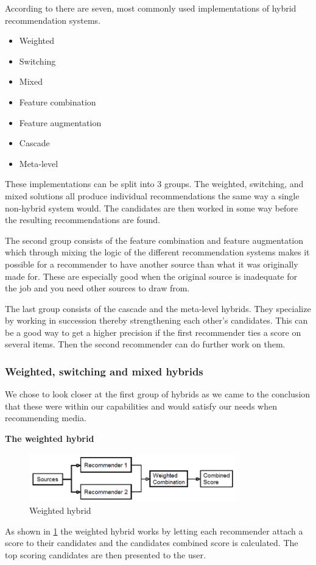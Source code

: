 According to \cite{TheAdaptiveWeb} there are seven, most commonly used implementations of hybrid recommendation systems. 

\begin{itemize}
\item Weighted
\item Switching
\item Mixed
\item Feature combination
\item Feature augmentation
\item Cascade
\item Meta-level
\end{itemize}

These implementations can be split into 3 groups. The weighted, switching, and mixed solutions all produce individual recommendations the same way a single non-hybrid system would. The candidates are then worked in some way before the resulting recommendations are found.

The second group consists of the feature combination and feature augmentation which through mixing the logic of the different recommendation systems makes it possible for a recommender to have another source than what it was originally made for. These are especially good when the original source is inadequate for the job and you need other sources to draw from.

The last group consists of the cascade and the meta-level hybrids. They specialize by working in succession thereby strengthening each other's candidates. This can be a good way to get a higher precision if the first recommender ties a score on several items. Then the second recommender can do further work on them. 

\subsubsection{Weighted, switching and mixed hybrids} 
We chose to look closer at the first group of hybrids as we came to the conclusion that these were within our capabilities and would satisfy our needs when recommending media.



\textbf{The weighted hybrid}


\begin{figure}[H]
\centering
\includegraphics[width=0.8\textwidth]{Images/Weightedhybrid.png}
\caption{Weighted hybrid}
\label{Weighted}
\end{figure}
As shown in \ref{Weighted} the weighted hybrid works by letting each recommender attach a score to their candidates and the candidates combined score is calculated. The top scoring candidates are then presented to the user. 



